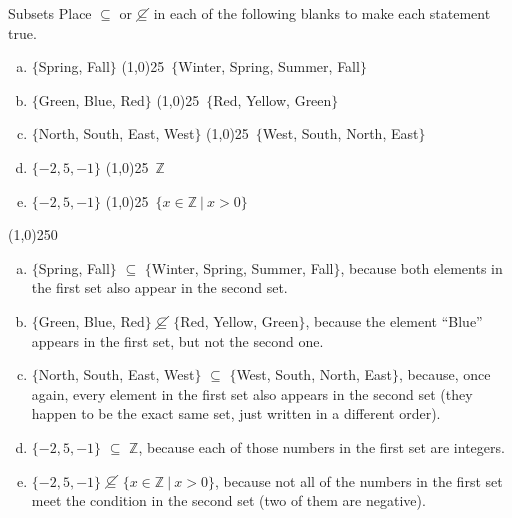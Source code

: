 \begin{example}[https://www.youtube.com/watch?v=5n1TZYFCeYo]{Subsets}
Place $\subseteq$ or $\cancel{\subseteq}$ in each of the following blanks to make each statement true.\\

\begin{enumerate}[(a)]
\item $\{$Spring, Fall$\}$ \line(1,0){25}\ $\{$Winter, Spring, Summer, Fall$\}$\\

\item $\{$Green, Blue, Red$\}$ \line(1,0){25}\ $\{$Red, Yellow, Green$\}$\\

\item $\{$North, South, East, West$\}$ \line(1,0){25}\ $\{$West, South, North, East$\}$\\

\item $\{-2,5,-1\}$ \line(1,0){25}\ $\mathbb{Z}$\\

\item $\{-2,5,-1\}$ \line(1,0){25}\ $\{x \in \mathbb{Z}\ |\ x > 0\}$
\end{enumerate}

\begin{center}
\line(1,0){250}
\end{center}

\begin{enumerate}[(a)]
\item $\{$Spring, Fall$\}$ $\subseteq$ $\{$Winter, Spring, Summer, Fall$\}$, \sol because both elements in the first set also appear in the second set.\\

\item $\{$Green, Blue, Red$\}$ $\cancel{\subseteq}$ $\{$Red, Yellow, Green$\}$, because the element ``Blue'' appears in the first set, but not the second one.\\

\item $\{$North, South, East, West$\}$ $\subseteq$ $\{$West, South, North, East$\}$, because, once again, every element in the first set also appears in the second set (they happen to be the exact same set, just written in a different order).\\

\item $\{-2,5,-1\}$ $\subseteq$ $\mathbb{Z}$, because each of those numbers in the first set are integers.\\

\item $\{-2,5,-1\}$ $\cancel{\subseteq}$ $\{x \in \mathbb{Z}\ |\ x > 0\}$, because not all of the numbers in the first set meet the condition in the second set (two of them are negative).
\end{enumerate}
\end{example}

